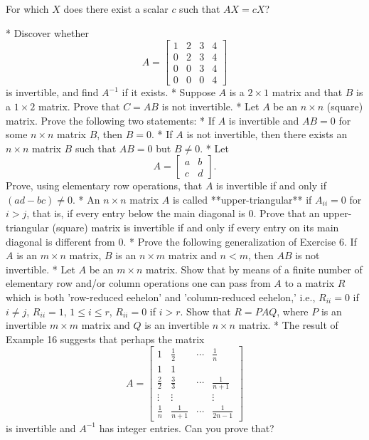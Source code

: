 
For which \(X\) does there exist a scalar \(c\) such that \(AX=cX\)?

* Discover whether \[A=\begin{bmatrix}1&2&3&4\\ 0&2&3&4\\ 0&0&3&4\\ 0&0&0&4\end{bmatrix}\] is invertible, and find \(A^{-1}\) if it exists.
* Suppose \(A\) is a \(2\times 1\) matrix and that \(B\) is a \(1\times 2\) matrix. Prove that \(C=AB\) is not invertible.
* Let \(A\) be an \(n\times n\) (square) matrix. Prove the following two statements:
* If \(A\) is invertible and \(AB=0\) for some \(n\times n\) matrix \(B\), then \(B=0\).
* If \(A\) is not invertible, then there exists an \(n\times n\) matrix \(B\) such that \(AB=0\) but \(B\neq 0\).
* Let \[A=\begin{bmatrix}a&b\\ c&d\end{bmatrix}.\] Prove, using elementary row operations, that \(A\) is invertible if and only if \((ad-bc)\neq 0\).
* An \(n\times n\) matrix \(A\) is called **upper-triangular** if \(A_{ii}=0\) for \(i>j\), that is, if every entry below the main diagonal is \(0\). Prove that an upper-triangular (square) matrix is invertible if and only if every entry on its main diagonal is different from \(0\).
* Prove the following generalization of Exercise 6. If \(A\) is an \(m\times n\) matrix, \(B\) is an \(n\times m\) matrix and \(n<m\), then \(AB\) is not invertible.
* Let \(A\) be an \(m\times n\) matrix. Show that by means of a finite number of elementary row and/or column operations one can pass from \(A\) to a matrix \(R\) which is both 'row-reduced eehelon' and 'column-reduced eehelon,' i.e., \(R_{ii}=0\) if \(i\neq j\), \(R_{ii}=1\), \(1\leq i\leq r\), \(R_{ii}=0\) if \(i>r\). Show that \(R=PAQ\), where \(P\) is an invertible \(m\times m\) matrix and \(Q\) is an invertible \(n\times n\) matrix.
* The result of Example 16 suggests that perhaps the matrix \[A=\begin{bmatrix}1&\frac{1}{2}&\cdots&\frac{1}{n}\\ 1&1&\\ \frac{2}{2}&\frac{3}{3}&\cdots&\frac{1}{n+1}\\ \vdots&\vdots&&\vdots\\ \frac{1}{n}&\frac{1}{n+1}&\cdots&\frac{1}{2n-1}\end{bmatrix}\] is invertible and \(A^{-1}\) has integer entries. Can you prove that? 